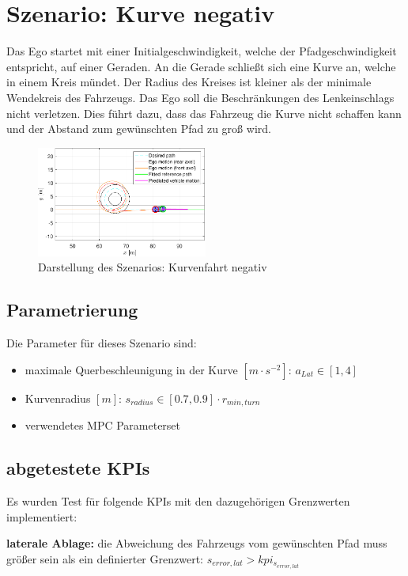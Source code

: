 \section{Szenario: Kurve negativ} \label{sec:kurveNegativ}
Das Ego startet mit einer Initialgeschwindigkeit, welche der Pfadgeschwindigkeit entspricht, auf einer Geraden. An die Gerade schließt sich eine Kurve an, welche in einem Kreis mündet. Der Radius des Kreises ist kleiner als der minimale Wendekreis des Fahrzeugs. Das Ego soll die Beschränkungen des Lenkeinschlags nicht verletzen. Dies führt dazu, dass das Fahrzeug die Kurve nicht schaffen kann und der Abstand zum gewünschten Pfad zu groß wird.
\begin{figure}[ht]
    \centering
    \includegraphics[width=0.5\textwidth]{figures/3_Implementierung/Curve_negative/test_curve_negative_depiction.pdf}
    \caption{Darstellung des Szenarios: Kurvenfahrt negativ}
    \label{fig:test_curve_negative_depiction}
\end{figure}

\subsection{Parametrierung}
Die Parameter für dieses Szenario sind:
\begin{itemize}
    \item maximale Querbeschleunigung in der Kurve $[m\cdot s^{-2}]$: $a_{Lat} \in [1,4]$
    \item Kurvenradius $[m]$: $s_{radius} \in [0.7,0.9]\cdot r_{min,turn}$
    \item verwendetes MPC Parameterset
\end{itemize}

\subsection{abgetestete KPIs}
Es wurden Test für folgende KPIs mit den dazugehörigen Grenzwerten implementiert:

\medskip\noindent\textbf{laterale Ablage:} die Abweichung des Fahrzeugs vom gewünschten Pfad muss größer sein als ein definierter Grenzwert: $s_{error,lat} > kpi_{s_{error,lat}}$

